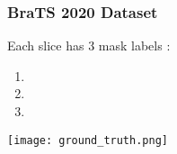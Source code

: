 \documentclass[../presentation.tex]{subfiles} %
\begin{document}
\begin{frame}

	\frametitle{BraTS 2020 Dataset}
	Each slice has 3 mask labels :
    \begin{enumerate}
			\item {}
			\item {}
			\item {}
    \end{enumerate}
    \begin{center}
			\texttt{[image: ground\_truth.png]}
    \end{center}

\end{frame}
\end{document}
